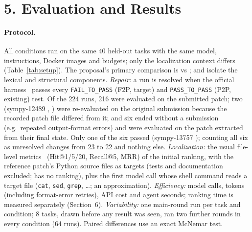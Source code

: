 \section*{5. Evaluation and Results}

\paragraph{Protocol.}
All conditions ran on the same 40 held-out tasks with the same model, instructions, Docker images
and budgets; only the localization context differs (Table~\ref{tab:setup}). The proposal's primary
comparison is \condA{} vs \condD; \condB{} and \condC{} isolate the lexical and structural components.
\emph{Repair:} a run is resolved when the official harness~\cite{jimenez2024swebench,swebenchharness}
passes every \texttt{FAIL\_TO\_PASS} (F2P, target) and \texttt{PASS\_TO\_PASS} (P2P, existing) test.
Of the 224 runs, 216 were evaluated on the submitted patch; two (sympy-12489 \condB, \condC) were
re-evaluated on the original submission because the recorded patch file differed from it; and six
ended without a submission (e.g.\ repeated output-format errors) and were evaluated on the patch
extracted from their final state. Only one of the six passed (sympy-13757 \condB); counting all six as
unresolved changes \condB{} from 23 to 22 and nothing else.
\emph{Localization:} the usual file-level metrics~\cite{zhou2012buglocator,chen2025locagent}
(Hit@1/5/20, Recall@5, MRR) of the initial ranking, with the reference patch's Python source files as
targets (tests and documentation excluded; \condA{} has no ranking), plus the first model call whose
shell command reads a target file (\texttt{cat}, \texttt{sed}, \texttt{grep}, \dots; an approximation).
\emph{Efficiency:} model calls, tokens (including format-error retries), API cost and agent seconds;
ranking time is measured separately (Section~6).
\emph{Variability:} one main-round run per task and condition; 8 tasks, drawn before any result was
seen, ran two further rounds in every condition (64 runs). Paired differences use an exact McNemar test.

